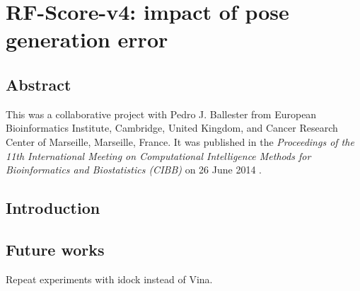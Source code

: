 \chapter{RF-Score-v4: impact of pose generation error}

\section{Abstract}

This was a collaborative project with Pedro J. Ballester from European Bioinformatics Institute, Cambridge, United Kingdom, and Cancer Research Center of Marseille, Marseille, France. It was published in the \textit{Proceedings of the 11th International Meeting on Computational Intelligence Methods for Bioinformatics and Biostatistics (CIBB)} on 26 June 2014 \citep{1434}.

\section{Introduction}



\section{Future works}

Repeat experiments with idock instead of Vina.

\chapterend
